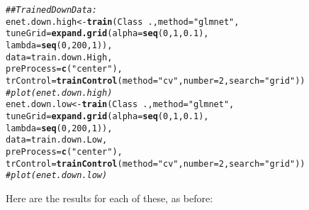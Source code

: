 \documentclass[12pt]{article}\usepackage[]{graphicx}\usepackage[]{color}
\makeatletter
\newcommand{\hlnum}[1]{\textcolor[rgb]{0.686,0.059,0.569}{#1}}%
\newcommand{\hlstr}[1]{\textcolor[rgb]{0.192,0.494,0.8}{#1}}%
\newcommand{\hlcom}[1]{\textcolor[rgb]{0.678,0.584,0.686}{\textit{#1}}}%
\newcommand{\hlopt}[1]{\textcolor[rgb]{0,0,0}{#1}}%
\newcommand{\hlstd}[1]{\textcolor[rgb]{0.345,0.345,0.345}{#1}}%
\newcommand{\hlkwb}[1]{\textcolor[rgb]{0.69,0.353,0.396}{#1}}%
\newcommand{\hlkwc}[1]{\textcolor[rgb]{0.333,0.667,0.333}{#1}}%
\newcommand{\hlkwd}[1]{\textcolor[rgb]{0.737,0.353,0.396}{\textbf{#1}}}%
\newenvironment{kframe}{%
 \def\at@end@of@kframe{}%
 \ifinner\ifhmode%
  \def\at@end@of@kframe{\end{minipage}}%
  \begin{minipage}{\columnwidth}%
 \fi\fi%
 \def\FrameCommand##1{\hskip\@totalleftmargin \hskip-\fboxsep
 \colorbox{shadecolor}{##1}\hskip-\fboxsep
     \hskip-\linewidth \hskip-\@totalleftmargin \hskip\columnwidth}%
 \MakeFramed {\advance\hsize-\width
   \@totalleftmargin\z@ \linewidth\hsize
   \@setminipage}}%
 {\par\unskip\endMakeFramed%
 \at@end@of@kframe}
\newenvironment{knitrout}{}{} %
\makeatother
\begin{document}
\begin{flushleft}
\begin{knitrout}
\begin{kframe}
\begin{alltt}
\hlcom{## Trained Down Data:}
\hlstd{enet.down.high} \hlkwb{<-} \hlkwd{train}\hlstd{(Class}\hlopt{~}\hlstd{.,} \hlkwc{method}\hlstd{=}\hlstr{"glmnet"}\hlstd{,}
                      \hlkwc{tuneGrid}\hlstd{=}\hlkwd{expand.grid}\hlstd{(}\hlkwc{alpha}\hlstd{=}\hlkwd{seq}\hlstd{(}\hlnum{0}\hlstd{,} \hlnum{1}\hlstd{,} \hlnum{0.1}\hlstd{),}
                                           \hlkwc{lambda}\hlstd{=}\hlkwd{seq}\hlstd{(}\hlnum{0}\hlstd{,} \hlnum{200}\hlstd{,} \hlnum{1}\hlstd{)),}
                      \hlkwc{data}\hlstd{=train.down.High,}
                      \hlkwc{preProcess}\hlstd{=}\hlkwd{c}\hlstd{(}\hlstr{"center"}\hlstd{),}
                      \hlkwc{trControl}\hlstd{=}\hlkwd{trainControl}\hlstd{(}\hlkwc{method}\hlstd{=}\hlstr{"cv"}\hlstd{,}\hlkwc{number}\hlstd{=}\hlnum{2}\hlstd{,} \hlkwc{search}\hlstd{=}\hlstr{"grid"}\hlstd{))}
\hlcom{# plot(enet.down.high)}
\hlstd{enet.down.low} \hlkwb{<-} \hlkwd{train}\hlstd{(Class}\hlopt{~}\hlstd{.,} \hlkwc{method}\hlstd{=}\hlstr{"glmnet"}\hlstd{,}
                     \hlkwc{tuneGrid}\hlstd{=}\hlkwd{expand.grid}\hlstd{(}\hlkwc{alpha}\hlstd{=}\hlkwd{seq}\hlstd{(}\hlnum{0}\hlstd{,} \hlnum{1}\hlstd{,} \hlnum{0.1}\hlstd{),}
                                          \hlkwc{lambda}\hlstd{=}\hlkwd{seq}\hlstd{(}\hlnum{0}\hlstd{,} \hlnum{200}\hlstd{,} \hlnum{1}\hlstd{)),}
                     \hlkwc{data}\hlstd{=train.down.Low,}
                     \hlkwc{preProcess}\hlstd{=}\hlkwd{c}\hlstd{(}\hlstr{"center"}\hlstd{),}
                     \hlkwc{trControl}\hlstd{=}\hlkwd{trainControl}\hlstd{(}\hlkwc{method}\hlstd{=}\hlstr{"cv"}\hlstd{,}\hlkwc{number}\hlstd{=}\hlnum{2}\hlstd{,} \hlkwc{search}\hlstd{=}\hlstr{"grid"}\hlstd{))}
\hlcom{# plot(enet.down.low)}
\end{alltt}
\end{kframe}
\end{knitrout}


Here are the results for each of these, as before:


\end{flushleft}
\end{document}
